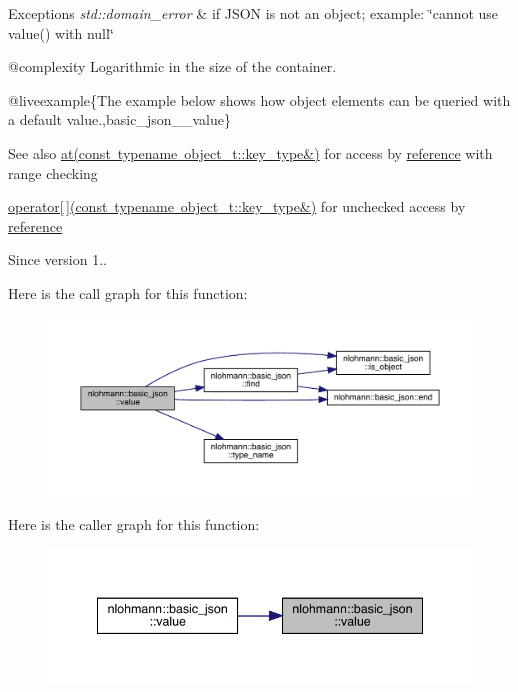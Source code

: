 \begin{DoxyExceptions}{Exceptions}
{\em std\+::domain\+\_\+error} & if J\+S\+ON is not an object; example\+: {\ttfamily \char`\"{}cannot use
value() with null\char`\"{}}\\
\hline
\end{DoxyExceptions}
@complexity Logarithmic in the size of the container.

@liveexample\{The example below shows how object elements can be queried with a default value.,basic\+\_\+json\+\_\+\+\_\+value\}

\begin{DoxySeeAlso}{See also}
\mbox{\hyperlink{classnlohmann_1_1basic__json_a93403e803947b86f4da2d1fb3345cf2c}{at(const typename object\+\_\+t\+::key\+\_\+type\&)}} for access by \mbox{\hyperlink{classnlohmann_1_1basic__json_ac6a5eddd156c776ac75ff54cfe54a5bc}{reference}} with range checking 

\mbox{\hyperlink{classnlohmann_1_1basic__json_a233b02b0839ef798942dd46157cc0fe6}{operator\mbox{[}$\,$\mbox{]}(const typename object\+\_\+t\+::key\+\_\+type\&)}} for unchecked access by \mbox{\hyperlink{classnlohmann_1_1basic__json_ac6a5eddd156c776ac75ff54cfe54a5bc}{reference}}
\end{DoxySeeAlso}
\begin{DoxySince}{Since}
version 1.. 
\end{DoxySince}
Here is the call graph for this function\+:
\nopagebreak
\begin{figure}[H]
\begin{center}
\leavevmode
\includegraphics[width=350pt]{classnlohmann_1_1basic__json_af9c51328fbe1da75eca750be3009917a_cgraph}
\end{center}
\end{figure}
Here is the caller graph for this function\+:
\nopagebreak
\begin{figure}[H]
\begin{center}
\leavevmode
\includegraphics[width=341pt]{classnlohmann_1_1basic__json_af9c51328fbe1da75eca750be3009917a_icgraph}
\end{center}
\end{figure}
